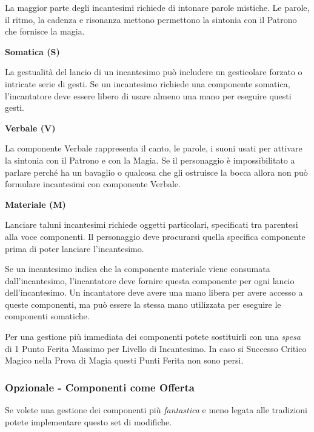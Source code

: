 \begin{multicols}{2}
La maggior parte degli incantesimi richiede di intonare parole mistiche. Le parole, il ritmo, la cadenza e risonanza mettono permettono la sintonia con il Patrono che fornisce la magia.

\textbf{Somatica (S)}

La gestualità del lancio di un incantesimo può includere un gesticolare forzato o intricate serie di gesti. Se un incantesimo richiede una componente somatica, l'incantatore deve essere libero di usare almeno una mano per eseguire questi gesti.

\textbf{Verbale (V)}

La componente Verbale rappresenta il canto, le parole, i suoni usati per attivare la sintonia con il Patrono e con la Magia. Se il personaggio è impossibilitato a parlare perché ha un bavaglio o qualcosa che gli ostruisce la bocca allora non può formulare incantesimi con componente Verbale.

\textbf{Materiale (M)}

Lanciare taluni incantesimi richiede oggetti particolari, specificati tra parentesi alla voce componenti. Il personaggio deve procurarsi quella specifica componente prima di poter lanciare l'incantesimo.

Se un incantesimo indica che la componente materiale viene consumata dall'incantesimo, l'incantatore deve fornire questa componente per ogni lancio dell'incantesimo.
Un incantatore deve avere una mano libera per avere accesso a queste componenti, ma può essere la stessa mano utilizzata per eseguire le componenti somatiche.

\begin{changemargin}{0.3cm}{0.3cm}\begin{narratore}
Per una gestione più immediata dei componenti potete sostituirli con una \emph{spesa} di 1 Punto Ferita Massimo per Livello di Incantesimo. In caso si Successo Critico Magico nella Prova di Magia questi Punti Ferita non sono persi.
\end{narratore}\end{changemargin}

\subsubsection{Opzionale - Componenti come Offerta}\label{componenticomeofferta}\hypertarget{componenticomeofferta}{}

Se volete una gestione dei componenti più \emph{fantastica} e meno legata alle tradizioni potete implementare questo set di modifiche.


\end{multicols}
